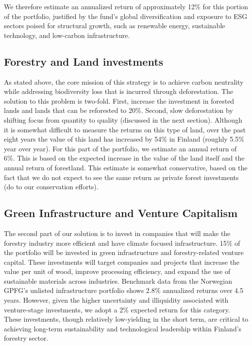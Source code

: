 \par We therefore estimate an annualized return of approximately 12\% for this portion of the portfolio, justified by the fund’s global diversification and exposure to ESG sectors poised for structural growth, such as renewable energy, sustainable technology, and low-carbon infrastructure.


\subsection{Forestry and Land investments}
As stated above, the core mission of this strategy is to achieve carbon neutrality while addressing biodiversity loss that is incurred through deforestation. The solution to this problem is two-fold. First, increase the investment in forested lands and lands that can be reforested to 20\%. Second, slow deforestation by shifting focus from quantity to quality (discussed in the next section). Although it is somewhat difficult to measure the returns on this type of land, over the past eight years the value of this land has increased by 54\% in Finland (roughly 5.5\% year over year). For this part of the portfolio, we estimate an annual return of 6\%. This is based on the expected increase in the value of the land itself and the annual return of forestland. This estimate is somewhat conservative, based on the fact that we do not expect to see the same return as private forest investments (do to our conservation efforts).

\subsection{Green Infrastructure and Venture Capitalism}
The second part of our solution is to invest in companies that will make the forestry industry more efficient and have climate focused infrastructure. 15\% of the portfolio will be invested in green infrastructure and forestry-related venture capital. These investments will target companies and projects that increase the value per unit of wood, improve processing efficiency, and expand the use of sustainable materials across industries.
Benchmark data from the Norwegian GPFG’s unlisted infrastructure portfolio shows 2.8\% annualized returns over 4.5 years. However, given the higher uncertainty and illiquidity associated with venture-stage investments, we adopt a 2\% expected return for this category. These investments, though relatively low-yielding in the short term, are critical to achieving long-term sustainability and technological leadership within Finland’s forestry sector.


